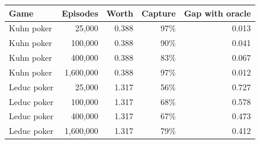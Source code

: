 \begin{tabular}{l r r r r}
\toprule
Game & Episodes & Worth & Capture & Gap with oracle \\
\midrule
Kuhn poker & 25,000 & 0.388 & 97\% & 0.013 \\
Kuhn poker & 100,000 & 0.388 & 90\% & 0.041 \\
Kuhn poker & 400,000 & 0.388 & 83\% & 0.067 \\
Kuhn poker & 1,600,000 & 0.388 & 97\% & 0.012 \\
Leduc poker & 25,000 & 1.317 & 56\% & 0.727 \\
Leduc poker & 100,000 & 1.317 & 68\% & 0.578 \\
Leduc poker & 400,000 & 1.317 & 67\% & 0.473 \\
Leduc poker & 1,600,000 & 1.317 & 79\% & 0.412 \\
\bottomrule
\end{tabular}
